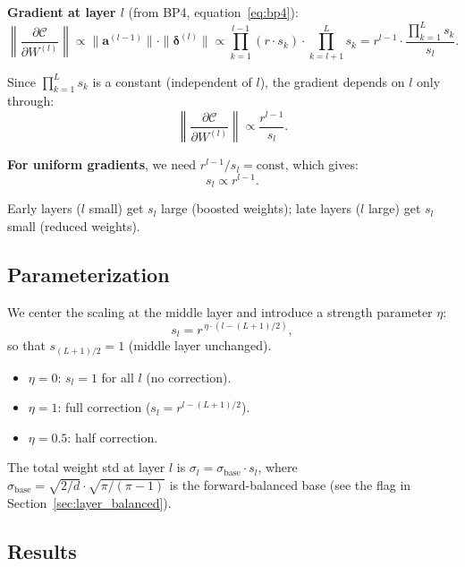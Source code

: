 \textbf{Gradient at layer $l$} (from BP4, equation~\eqref{eq:bp4}):
\begin{equation}\label{eq:grad_layer}
  \left\|\frac{\partial \mathcal{C}}{\partial W^{(l)}}\right\|
  \propto \|\bm{a}^{(l-1)}\| \cdot \|\bm{\delta}^{(l)}\|
  \propto \prod_{k=1}^{l-1}(r \cdot s_k) \cdot \prod_{k=l+1}^{L} s_k
  = r^{l-1} \cdot \frac{\prod_{k=1}^{L} s_k}{s_l}.
\end{equation}

Since $\prod_{k=1}^{L} s_k$ is a constant (independent of $l$),
the gradient depends on $l$ only through:
\begin{equation}\label{eq:grad_prop}
  \left\|\frac{\partial \mathcal{C}}{\partial W^{(l)}}\right\|
  \propto \frac{r^{l-1}}{s_l}.
\end{equation}

\textbf{For uniform gradients}, we need $r^{l-1}/s_l = \text{const}$,
which gives:
\begin{equation}\label{eq:optimal_sl}
  s_l \propto r^{l-1}.
\end{equation}

Early layers ($l$ small) get $s_l$ large (boosted weights);
late layers ($l$ large) get $s_l$ small (reduced weights).

\subsection{Parameterization}

We center the scaling at the middle layer and introduce a strength
parameter $\eta$:
\begin{equation}\label{eq:sl_param}
  s_l = r^{\,\eta \cdot (l - (L+1)/2)},
\end{equation}
so that $s_{(L+1)/2} = 1$ (middle layer unchanged).

\begin{itemize}
  \item $\eta = 0$: $s_l = 1$ for all $l$ (no correction).
  \item $\eta = 1$: full correction ($s_l = r^{l-(L+1)/2}$).
  \item $\eta = 0.5$: half correction.
\end{itemize}

The total weight std at layer $l$ is
$\sigma_l = \sigma_{\mathrm{base}} \cdot s_l$, where
$\sigma_{\mathrm{base}} = \sqrt{2/d} \cdot \sqrt{\pi/(\pi-1)}$
is the forward-balanced base (see the flag in
Section~\ref{sec:layer_balanced}).

\subsection{Results}

